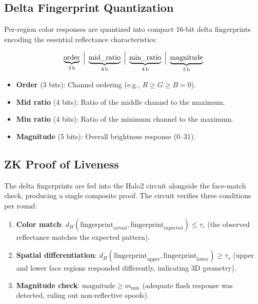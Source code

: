 \documentclass[conference]{IEEEtran}
\begin{document}
\subsection{Delta Fingerprint Quantization}

Per-region color responses are quantized into compact 16-bit delta fingerprints encoding the essential reflectance characteristics:

\begin{equation}
\underbrace{\text{order}}_{\text{3\,b}} \;\Big|\; \underbrace{\text{mid\_ratio}}_{\text{4\,b}} \;\Big|\; \underbrace{\text{min\_ratio}}_{\text{4\,b}} \;\Big|\; \underbrace{\text{magnitude}}_{\text{5\,b}}
\label{eq:fingerprint}
\end{equation}

\begin{itemize}
\item \textbf{Order} (3 bits): Channel ordering (e.g., $R \geq G \geq B = 0$).
\item \textbf{Mid ratio} (4 bits): Ratio of the middle channel to the maximum.
\item \textbf{Min ratio} (4 bits): Ratio of the minimum channel to the maximum.
\item \textbf{Magnitude} (5 bits): Overall brightness response (0--31).
\end{itemize}

\subsection{ZK Proof of Liveness}

The delta fingerprints are fed into the Halo2 circuit alongside the face-match check, producing a single composite proof. The circuit verifies three conditions per round:

\begin{enumerate}
\item \textbf{Color match}: $d_H(\text{fingerprint}_{\text{actual}}, \text{fingerprint}_{\text{expected}}) \leq \tau_c$ (the observed reflectance matches the expected pattern).
\item \textbf{Spatial differentiation}: $d_H(\text{fingerprint}_{\text{upper}}, \text{fingerprint}_{\text{lower}}) \geq \tau_s$ (upper and lower face regions responded differently, indicating 3D geometry).
\item \textbf{Magnitude check}: $\text{magnitude} \geq m_{\min}$ (adequate flash response was detected, ruling out non-reflective spoofs).
\end{enumerate}
\end{document}
